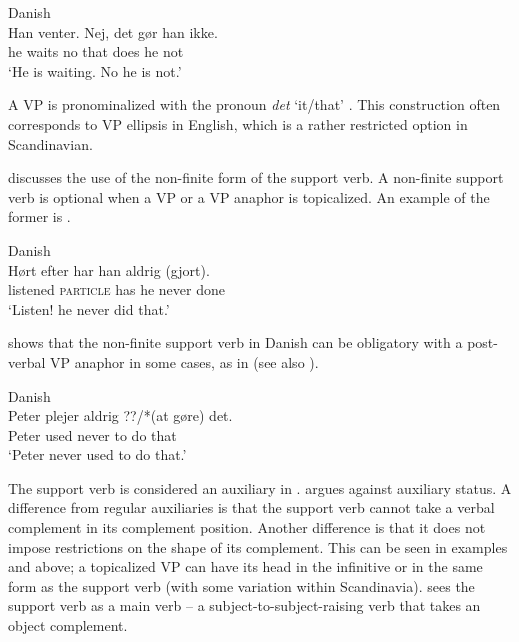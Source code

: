 \documentclass[output=paper,hidelinks]{langscibook}
\begin{document}
\ea\label{ex:Scandinavian:60} Danish \citep[410]{Oersnes11}\\
\gll
 {Han} {venter.} {Nej,} {det} {gør} {han} {ikke}\textsc{.}\\
 he waits no that does he not \\
\glt `He is waiting. No he is not.'\z

\noindent A VP is pronominalized with the pronoun \textit{det} `it/that' \citep{Lodrup94}. This construction often corresponds to VP ellipsis in English, which is a rather restricted option in Scandinavian.

\citet{Oersnes11}  discusses the use of the non-finite form of the support verb. A non-finite support verb is optional when a VP or a VP anaphor is topicalized. An example of the former is .



\ea\label{ex:Scandinavian:61} Danish \citep[420]{Oersnes11}\\
\gll
 {Hørt} {efter} {har} {han} {aldrig} {(gjort)}\textsc{.}\\
 listened \textsc{particle} has he never done \\
\glt `Listen! he never did that.'\z

\noindent \citet{Oersnes11}  shows that the non-finite support verb in Danish can be obligatory with a post-verbal VP anaphor in some cases, as in  (see also \citealt{Oersnes13}).



\ea\label{ex:Scandinavian:62} Danish \citep[419]{Oersnes11}\\
\gll
 {Peter} {plejer} {aldrig} {??/*(at} {gøre)} {det}\textsc{.}\\
 Peter used never \phantom{??/*(}to do that \\
\glt `Peter never used to do that.'\z

\noindent The support verb is considered an auxiliary in \citet{Lodrup90,Lodrup94}. \citet{Oersnes11}  argues against auxiliary status. A difference from regular auxiliaries is that the support verb cannot take a verbal complement in its complement position. Another difference is that it does not impose restrictions on the shape of its complement. This can be seen in examples  and  above; a topicalized VP can have its head in the infinitive or in the same form as the support verb (with some variation within Scandinavia). \citet{Oersnes11} sees the support verb as a main verb -- a subject-to-subject-raising verb that takes an object complement.
\end{document}
